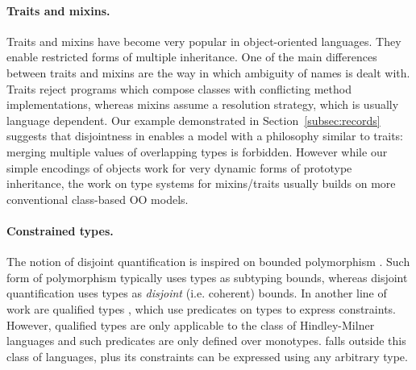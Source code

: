 
%
%
%
%
%
%

\paragraph{Traits and mixins.}
Traits \cite{ducasse2006traits,fisher04atyped,odersky2005scalable} and mixins 
\cite{bracha1990mixin,ancona96algebraic,flatt1998classes,findler1998modular,ancona2003jam,bettini2004corecalculus} 
have become very popular in object-oriented languages. 
They enable restricted forms of multiple inheritance.
One of the main differences between traits and mixins are the way in
which ambiguity of names is dealt with.
Traits reject programs which compose classes with 
conflicting method implementations, whereas mixins assume a resolution strategy,
which is usually language dependent. 
Our example demonstrated in Section~\ref{subsec:records} suggests that
disjointness in \name enables a model with a philosophy similar to
traits: merging multiple values of overlapping types is forbidden. However while our 
simple encodings of objects work for very dynamic forms of prototype
inheritance, the work on type systems for mixins/traits usually builds
on more conventional class-based OO models.

\paragraph{Constrained types.}
The notion of disjoint quantification is inspired on bounded polymorphism .
Such form of polymorphism typically uses types as subtyping bounds, whereas disjoint
quantification uses types as \emph{disjoint} (i.e. coherent) bounds.
In another line of work are qualified types , which use predicates on types to
express constraints.
However, qualified types are only applicable to the class of Hindley-Milner  
languages and such predicates are only defined over monotypes.
\name falls outside this class of languages, plus its constraints can be expressed using 
any arbitrary type.


